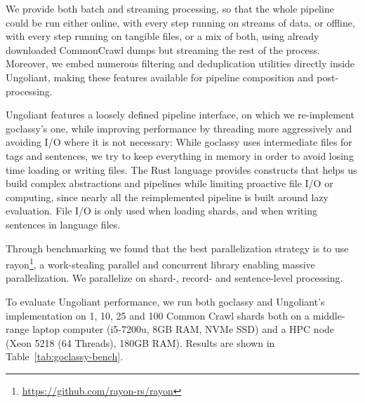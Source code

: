 We provide both batch and streaming processing, so that the whole pipeline could be run either online, with every step running on streams of data, or offline, with every step running on tangible files, or a mix of both, using already downloaded CommonCrawl dumps but streaming the rest of the process. Moreover, we embed numerous filtering and deduplication utilities directly inside Ungoliant, making these features available for pipeline composition and post-processing.

Ungoliant features a loosely defined pipeline interface, on which we re-implement goclassy's one, while improving performance by threading more aggressively and avoiding I/O where it is not necessary: While goclassy uses intermediate files for tags and sentences, we try to keep everything in memory in order to avoid losing time loading or writing files. The Rust language provides constructs that helps us build complex abstractions and pipelines while limiting proactive file I/O or computing, since nearly all the reimplemented pipeline is built around lazy evaluation. File I/O is only used when loading shards, and when writing sentences in language files.

Through benchmarking we found that the best parallelization strategy is to use rayon\footnote{\url{https://github.com/rayon-rs/rayon}}, a work-stealing \cite{blumofe-etal-1999-scheduling} parallel and concurrent library enabling massive parallelization. We parallelize on \mbox{shard-,} record- and sentence-level processing.

To evaluate Ungoliant performance, we run both goclassy and Ungoliant's implementation on 1, 10, 25 and 100 Common Crawl shards both on a middle-range laptop computer (i5-7200u, 8GB RAM, NVMe SSD) and a HPC node (Xeon 5218 (64 Threads), 180GB RAM). Results are shown in Table~\ref{tab:goclassy-bench}.

